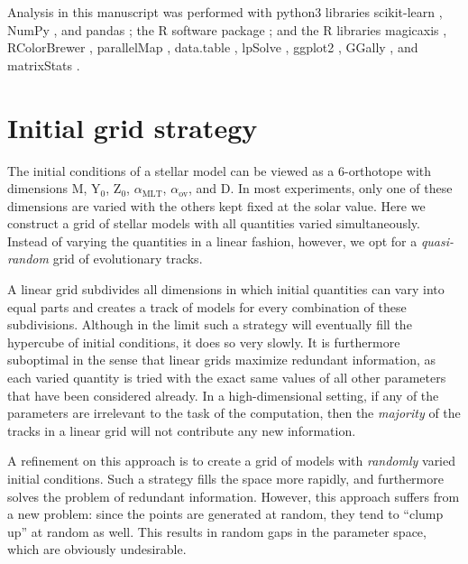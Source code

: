\documentclass[manuscript]{aastex}
\begin{document}
Analysis in this manuscript was performed with python3 libraries scikit-learn \citep{scikit-learn}, NumPy \citep{van2011numpy}, and pandas \citep{mckinney2010data}; the R software package \citep{R}; and the R libraries magicaxis \citep{magicaxis}, RColorBrewer \citep{RColorBrewer}, parallelMap \citep{parallelMap}, data.table \citep{data.table}, lpSolve \citep{lpSolve}, ggplot2 \citep{ggplot2}, GGally \citep{GGally}, and matrixStats \citep{matrixStats}. 

\appendix

\section{Initial grid strategy}
\label{sec:grid}
The initial conditions of a stellar model can be viewed as a 6-orthotope with dimensions M, Y$_0$, Z$_0$, $\alpha_{\text{MLT}}$, $\alpha_{\text{ov}}$, and D. In most experiments, only one of these dimensions are varied with the others kept fixed at the solar value. Here we construct a grid of stellar models with all quantities varied simultaneously. Instead of varying the quantities in a linear fashion, however, we opt for a \emph{quasi-random} grid of evolutionary tracks. 

A linear grid subdivides all dimensions in which initial quantities can vary into equal parts and creates a track of models for every combination of these subdivisions. Although in the limit such a strategy will eventually fill the hypercube of initial conditions, it does so very slowly. It is furthermore suboptimal in the sense that linear grids maximize redundant information, as each varied quantity is tried with the exact same values of all other parameters that have been considered already. In a high-dimensional setting, if any of the parameters are irrelevant to the task of the computation, then the \emph{majority} of the tracks in a linear grid will not contribute any new information.

A refinement on this approach is to create a grid of models with \emph{randomly} varied initial conditions. Such a strategy fills the space more rapidly, and furthermore solves the problem of redundant information. However, this approach suffers from a new problem: since the points are generated at random, they tend to ``clump up'' at random as well. This results in random gaps in the parameter space, which are obviously undesirable. %
\end{document}
